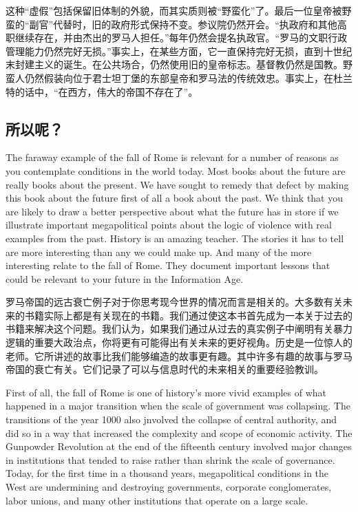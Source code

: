 \begin{Parallel}{97mm}{45mm}
  \ParallelRText
  {这种“虚假”包括保留旧体制的外貌，而其实质则被“野蛮化”了。最后一位皇帝被野蛮的“副官”代替时，旧的政府形式保持不变。参议院仍然开会。“执政府和其他高职继续存在，并由杰出的罗马人担任。”每年仍然会提名执政官。“罗马的文职行政管理能力仍然完好无损。”事实上，在某些方面，它一直保持完好无损，直到十世纪末封建主义的诞生。在公共场合，仍然使用旧的皇帝标志。基督教仍然是国教。野蛮人仍然假装向位于君士坦丁堡的东部皇帝和罗马法的传统效忠。事实上，在杜兰特的话中，“在西方，伟大的帝国不存在了”。}
  \ParallelPar

  \subsection{所以呢？}

  \ParallelLText
  {The faraway example of the fall of Rome is relevant for a number of reasons as you contemplate conditions in the world today. Most books about the future are really books about the present. We have sought to remedy that defect by making this book about the future first of all a book about the past. We think that you are likely to draw a better perspective about what the future has in store if we illustrate important megapolitical points about the logic of violence with real examples from the past. History is an amazing teacher. The stories it has to tell are more interesting than any we could make up. And many of the more interesting relate to the fall of Rome. They document important lessons that could be relevant to your future in the Information Age.}
  
  \ParallelRText
  {罗马帝国的远古衰亡例子对于你思考现今世界的情况而言是相关的。大多数有关未来的书籍实际上都是有关现在的书籍。我们通过使这本书首先成为一本关于过去的书籍来解决这个问题。我们认为，如果我们通过从过去的真实例子中阐明有关暴力逻辑的重要大政治点，你将更有可能得出有关未来的更好视角。历史是一位惊人的老师。它所讲述的故事比我们能够编造的故事更有趣。其中许多有趣的故事与罗马帝国的衰亡有关。它们记录了可以与信息时代的未来相关的重要经验教训。}
  \ParallelPar



  \ParallelLText
  {First of all, the fall of Rome is one of history's more vivid examples of what happened in a major transition when the scale of government was collapsing. The transitions of the year 1000 also jnvolved the collapse of central authority, and did so in a way that increased the complexity and scope of economic activity. The Gunpowder Revolution at the end of the fifteenth century involved major changes in institutions that tended to raise rather than shrink the scale of governance. Today, for the first time in a thousand years, megapolitical conditions in the West are undermining and destroying governments, corporate conglomerates, labor unions, and many other institutions that operate on a large scale.}
  

\end{Parallel}
